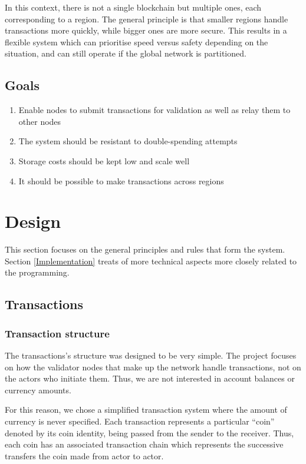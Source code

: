 \documentclass[11pt, a4paper, twoside, openright]{article}
\begin{document}
In this context, there is not a single blockchain but multiple ones, each corresponding to a region. The general principle is that smaller regions handle transactions more quickly, while bigger ones are more secure. This results in a flexible system which can prioritise speed versus safety depending on the situation, and can still operate if the global network is partitioned.

\subsection{Goals}

\begin{enumerate} 

\itemsep0em

 \item Enable nodes to submit transactions for validation as well as relay them to other nodes
 \item The system should be resistant to double-spending attempts
 \item Storage costs should be kept low and scale well
 \item It should be possible to make transactions across regions

\end{enumerate}



\section{Design}

This section focuses on the general principles and rules that form the system. Section \ref{Implementation} treats of more technical aspects more closely related to the programming.

\subsection{Transactions}
\subsubsection{Transaction structure}
The transactions's structure was designed to be very simple. The project focuses on how the validator nodes that make up the network handle transactions, not on the actors who initiate them. Thus, we are not interested in account balances or currency amounts. 

For this reason, we chose a simplified transaction system where the amount of currency is never specified. Each transaction represents a particular ``coin'' denoted by its coin identity, being passed from the sender to the receiver. Thus, each coin has an associated transaction chain which represents the successive transfers the coin made from actor to actor. 
\end{document}

